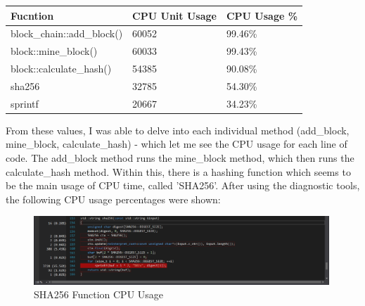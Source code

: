 \documentclass[12pt, a4paper]{article}
\begin{document}
\begin{center}
    \begin{tabular}{| l | l | l |}
    \hline
    Fucntion & CPU Unit Usage & CPU Usage \%  \\ \hline
    block\_chain::add\_block() & 60052 & 99.46\% \\ \hline
    block::mine\_block() & 60033 & 99.43\% \\ \hline
    block::calculate\_hash() & 54385 & 90.08\% \\ \hline
    sha256 & 32785 & 54.30\% \\ \hline
    sprintf & 20667 & 34.23\% \\ \hline
    \end{tabular}
\end{center}

From these values, I was able to delve into each individual method (add\_block, mine\_block, calculate\_hash) - which let me see the CPU usage for each line of code. The add\_block method runs the mine\_block method, which then runs the calculate\_hash method. Within this, there is a hashing function which seems to be the main usage of CPU time, called 'SHA256'. After using the diagnostic tools, the following CPU usage percentages were shown:

\begin{figure}[H]
	\centering
		\includegraphics[width=0.99\textwidth]{"SHA256"}
		\caption{SHA256 Function CPU Usage}
\end{figure}
\end{document}
